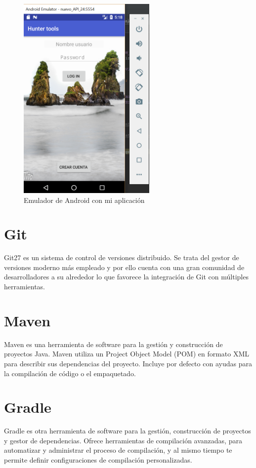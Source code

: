 \begin{figure}
		\centering
		\includegraphics[width=0.6\textwidth] {emulador.png}
		\caption{Emulador de Android con mi aplicación}
		\label{fig:emulador}
	\end{figure}
 



\section{Git}
Git27 es un sistema de control de versiones distribuido. Se trata del gestor de versiones moderno
más empleado y por ello cuenta con una gran comunidad de desarrolladores a su alrededor lo
que favorece la integración de Git con múltiples herramientas.
\section{Maven}
Maven es una herramienta de software para la gestión y construcción de proyectos Java.
 Maven utiliza un Project Object Model (POM) en formato
XML para describir sus dependencias del proyecto. Incluye por defecto con ayudas para la compilación de código o el empaquetado.






\section{Gradle}
Gradle es otra herramienta de software para la gestión, construcción de proyectos y gestor de dependencias. Ofrece
  herramientas de compilación avanzadas, para automatizar y administrar el proceso de compilación, y al mismo tiempo te permite definir configuraciones de compilación personalizadas.



